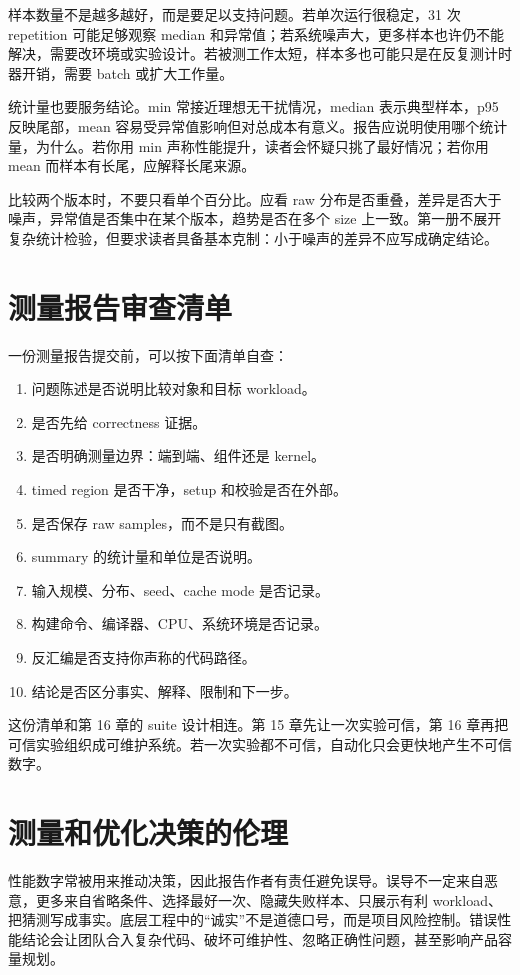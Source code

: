 样本数量不是越多越好，而是要足以支持问题。若单次运行很稳定，31 次 repetition 可能足够观察 median 和异常值；若系统噪声大，更多样本也许仍不能解决，需要改环境或实验设计。若被测工作太短，样本多也可能只是在反复测计时器开销，需要 batch 或扩大工作量。

统计量也要服务结论。min 常接近理想无干扰情况，median 表示典型样本，p95 反映尾部，mean 容易受异常值影响但对总成本有意义。报告应说明使用哪个统计量，为什么。若你用 min 声称性能提升，读者会怀疑只挑了最好情况；若你用 mean 而样本有长尾，应解释长尾来源。

比较两个版本时，不要只看单个百分比。应看 raw 分布是否重叠，差异是否大于噪声，异常值是否集中在某个版本，趋势是否在多个 size 上一致。第一册不展开复杂统计检验，但要求读者具备基本克制：小于噪声的差异不应写成确定结论。

\section{测量报告审查清单}

一份测量报告提交前，可以按下面清单自查：

\begin{enumerate}
  \item 问题陈述是否说明比较对象和目标 workload。
  \item 是否先给 correctness 证据。
  \item 是否明确测量边界：端到端、组件还是 kernel。
  \item timed region 是否干净，setup 和校验是否在外部。
  \item 是否保存 raw samples，而不是只有截图。
  \item summary 的统计量和单位是否说明。
  \item 输入规模、分布、seed、cache mode 是否记录。
  \item 构建命令、编译器、CPU、系统环境是否记录。
  \item 反汇编是否支持你声称的代码路径。
  \item 结论是否区分事实、解释、限制和下一步。
\end{enumerate}

这份清单和第 16 章的 suite 设计相连。第 15 章先让一次实验可信，第 16 章再把可信实验组织成可维护系统。若一次实验都不可信，自动化只会更快地产生不可信数字。

\section{测量和优化决策的伦理}

性能数字常被用来推动决策，因此报告作者有责任避免误导。误导不一定来自恶意，更多来自省略条件、选择最好一次、隐藏失败样本、只展示有利 workload、把猜测写成事实。底层工程中的“诚实”不是道德口号，而是项目风险控制。错误性能结论会让团队合入复杂代码、破坏可维护性、忽略正确性问题，甚至影响产品容量规划。


